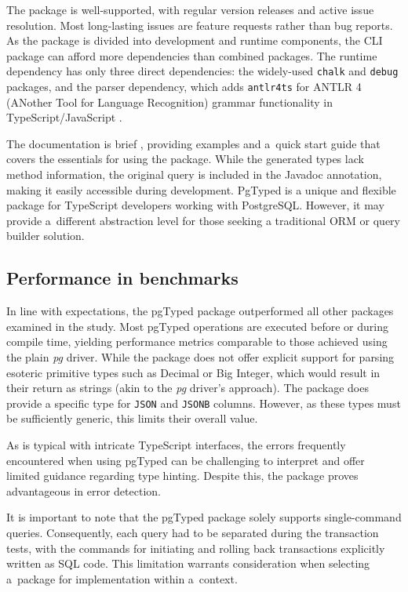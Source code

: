 The package is well-supported, with regular version releases and active issue
resolution. Most long-lasting issues are feature requests rather than bug
reports. As the package is divided into development and runtime components, the
CLI package can afford more dependencies than combined packages. The runtime
dependency has only three direct dependencies: the widely-used \texttt{chalk}
and \texttt{debug} packages, and the parser dependency, which adds
\texttt{antlr4ts} for ANTLR 4 (ANother Tool for Language Recognition) grammar
functionality in TypeScript/JavaScript \cite{pgtyped/runtime}.

The documentation is brief \cite{pgtyped-docs}, providing examples and a~quick
start guide that covers the essentials for using the package. While the
generated types lack method information, the original query is included in the
Javadoc annotation, making it easily accessible during development. PgTyped is a
unique and flexible package for TypeScript developers working with PostgreSQL.
However, it may provide a~different abstraction level for those seeking a
traditional ORM or query builder solution.

\subsection*{Performance in benchmarks}
In line with expectations, the pgTyped package outperformed all other packages
examined in the study. Most pgTyped operations are executed before or during
compile time, yielding performance metrics comparable to those achieved using
the plain \textit{pg} driver. While the package does not offer explicit support
for parsing esoteric primitive types such as Decimal or Big Integer, which would
result in their return as strings (akin to the \textit{pg} driver's approach).
The package does provide a specific type for \texttt{JSON} and \texttt{JSONB}
columns. However, as these types must be sufficiently generic, this limits their
overall value.

As is typical with intricate TypeScript interfaces, the errors frequently
encountered when using pgTyped can be challenging to interpret and offer
limited guidance regarding type hinting. Despite this, the package proves
advantageous in error detection.

It is important to note that the pgTyped package solely supports
single-command queries. Consequently, each query had to be separated during the
transaction tests, with the commands for initiating and rolling back
transactions explicitly written as SQL code. This limitation warrants
consideration when selecting a~package for implementation within a~context.
